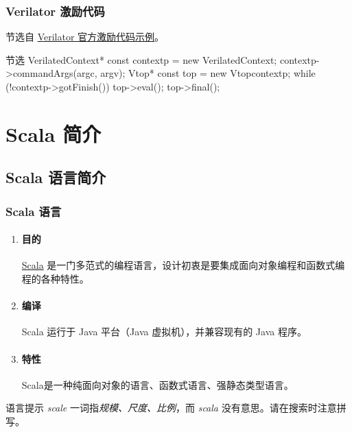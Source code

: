 \documentclass[xcolor=table,dvipsnames,svgnames,aspectratio=169]{ctexbeamer}
\begin{document}
\begin{frame}[fragile]
  \frametitle{Verilator 激励代码}
  节选自 \href{https://github.com/verilator/verilator/blob/a187a16e56e9d4f4435bcdc62fdf77f0600cd2d7/examples/make_hello_c/sim_main.cpp\#L14}{Verilator 官方激励代码示例}。
  \begin{codeblock}[language=c++]{节选}
VerilatedContext* const contextp = new VerilatedContext;
contextp->commandArgs(argc, argv);
Vtop* const top = new Vtop{contextp};
while (!contextp->gotFinish()) {
    top->eval();
  }
top->final();
  \end{codeblock}
\end{frame}

\section{Scala 简介}

\subsection{Scala 语言简介}

\begin{frame}
  \frametitle{Scala 语言}
  \begin{enumerate}
    \item \paragraph{目的} \href{https://www.scala-lang.org/}{Scala} 是一门多范式的编程语言，设计初衷是要集成面向对象编程和函数式编程的各种特性。
    \item \paragraph{编译} Scala 运行于 Java 平台（Java 虚拟机），并兼容现有的 Java 程序。
    \item \paragraph{特性} Scala是一种纯面向对象的语言、函数式语言、强静态类型语言。
  \end{enumerate}
  \begin{alertblock}{语言提示}
    \emph{scale} 一词指\emph{规模、尺度、比例}，而 \emph{scala} 没有意思。请在搜索时注意拼写。
  \end{alertblock}
\end{frame}
\end{document}
